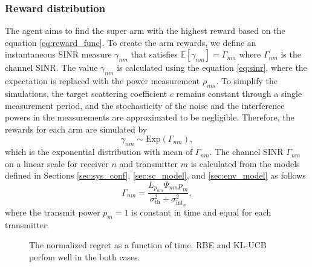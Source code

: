 \documentclass[english, 12pt, a4paper, elec, utf8, a-1b, online]{aaltothesis}
\numberwithin{equation}{section}
\newcommand{\E}[1]{\mathbb{E}\left[ #1 \right]}
\newcommand{\thnoise}{\sigma^2_{\text{th}}}
\newcommand{\epower}{p_{m}}
\newcommand{\eintnoise}{\sigma^2_{\text{int}_{n}}}
\newcommand{\esinr}{\gamma_{{nm}}}
\newcommand{\esinrexp}{\Gamma_{nm}}
\newcommand{\epl}{L_{p_{nm}}}
\newcommand{\ercs}{\Psi_{nm}}
\newcommand{\esp}{\rho_{nm}}
\begin{document}
\subsubsection{Reward distribution}

The agent aims to find the super arm with the highest reward based on the equation \eqref{eq:reward_func}. 
To create the arm rewards, we define an instantaneous SINR measure $\esinr$ that satisfies $\E{\esinr} = \esinrexp$ where $\esinrexp$ is the channel SINR. 
The value $\esinr$ is calculated using the equation \eqref{eq:sinr}, where the expectation is replaced with the power measurement $\esp$. 
To simplify the simulations, 
the target scattering coefficient $c$ remains constant through a single measurement period, and the stochasticity of the noise and the interference powers in the measurements are approximated to be negligible. 
Therefore, the rewards for each arm are simulated by
\begin{equation}
    \esinr  \sim \text{Exp}\left(\esinrexp\right),
\end{equation}
which is the exponential distribution with mean of $\esinrexp$.
The channel SINR $\esinrexp$ on a linear scale for receiver $n$ and transmitter $m$ is calculated from the models defined in Sections \ref{sec:sys_conf}, \ref{sec:sc_model}, and \ref{sec:env_model} as follows
\begin{equation}
    \esinrexp = \frac{\epl \ercs \epower}{\thnoise + \eintnoise},
\end{equation}
where the transmit power $\epower=1$ is constant in time and equal for each transmitter.


\begin{figure}[!tb]\centering
    \hfill
    \caption{The normalized regret as a function of time. 
            RBE and KL-UCB perfom well in the both cases.}
    \label{fig:regret}
\end{figure}
\end{document}
